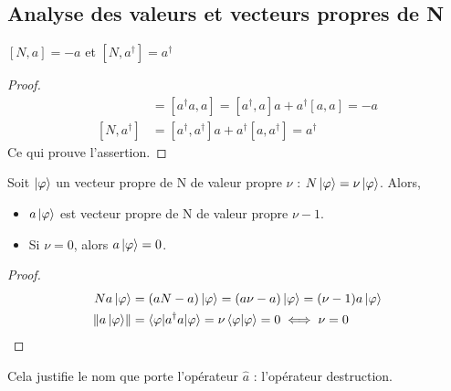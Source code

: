 \documentclass[../Notesdecours.tex]{subfiles}
\begin{document}
\subsection{Analyse des valeurs et vecteurs propres de N}

\begin{Property}
    $[N,a]=-a$ et $[N,a^\dagger] = a^\dagger$
\end{Property}
\begin{proof}
    \begin{align*}
        [N,a] &= [a^\dagger a,a] = [a^\dagger,a]a+a^\dagger [a,a] = -a\\
        [N,a^\dagger] &= [a^\dagger,a^\dagger]a+a^\dagger [a,a^\dagger] = a^\dagger
    \end{align*}
    Ce qui prouve l'assertion.
\end{proof}

\begin{Property}
    \label{Vp destruction}
    Soit $\ket{\varphi}$ un vecteur propre de N de valeur propre $\nu$ : $N\ket{\varphi} = \nu\ket{\varphi}$. Alors,
    \begin{itemize}
        \item $a\ket{\varphi}$ est vecteur propre de N de valeur propre $\nu-1$.
        \item Si $\nu = 0$, alors $a\ket{\varphi} = 0$.
    \end{itemize}
\end{Property}
\begin{proof}
    \begin{align*}
        N a\ket{\varphi} &= (aN-a)\ket{\varphi} = (a\nu-a)\ket{\varphi} = (\nu-1)a\ket{\varphi}\\
        \norm{a\ket{\varphi}} &= \braket{\varphi|a^\dagger a|\varphi} = \nu \braket{\varphi|\varphi} = 0 \iff \nu = 0
    \end{align*}
\end{proof}

\begin{remark}
    Cela justifie le nom que porte l'opérateur $\hat{a}$ : l'opérateur destruction.
\end{remark}
\end{document}

